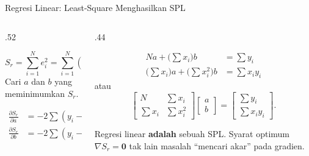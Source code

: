 \documentclass[aspectratio=169,10pt]{beamer}
\begin{document}
\begin{frame}{Regresi Linear: Least-Square Menghasilkan SPL}
\scriptsize
\begin{columns}[T,totalwidth=\textwidth]
\begin{column}{.52\textwidth}
\begin{bluebox}
\[
S_r=\sum_{i=1}^{N}e_i^2=\sum_{i=1}^{N}(y_i-a-bx_i)^2.
\]
Cari $a$ dan $b$ yang meminimumkan $S_r$.
\end{bluebox}
\begin{orangebox}
\[
\begin{aligned}
\frac{\partial S_r}{\partial a}&=-2\sum(y_i-a-bx_i)=0\\
\frac{\partial S_r}{\partial b}&=-2\sum(y_i-a-bx_i)x_i=0
\end{aligned}
\]
\end{orangebox}
\end{column}
\begin{column}{.44\textwidth}
\begin{greenbox}
\[
\begin{aligned}
Na+\Big(\textstyle\sum x_i\Big)b&=\textstyle\sum y_i\\
\Big(\textstyle\sum x_i\Big)a+\Big(\textstyle\sum x_i^2\Big)b&=\textstyle\sum x_iy_i
\end{aligned}
\]
atau
\[
\begin{bmatrix}N & \sum x_i\\ \sum x_i & \sum x_i^2\end{bmatrix}
\begin{bmatrix}a\\ b\end{bmatrix}
=\begin{bmatrix}\sum y_i\\ \sum x_iy_i\end{bmatrix}.
\]
\end{greenbox}
\begin{purplebox}
Regresi linear \textbf{adalah} sebuah SPL. Syarat optimum $\nabla S_r=\mathbf{0}$ tak lain masalah ``mencari akar'' pada gradien.
\end{purplebox}
\end{column}
\end{columns}
\end{frame}
\end{document}
